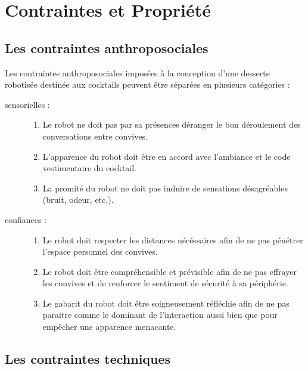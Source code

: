 \chapter{Contraintes et Propriété}

\section{Les contraintes anthroposociales}

Les contraintes anthroposociales imposées à la conception d'une desserte robotisée destinée aux cocktails peuvent être séparées en plusieurs catégories :
\begin{description}
\item[sensorielles :]
  \begin{enumerate}
  \item Le robot ne doit pas par sa présences déranger le bon déroulement des conversations entre convives.
  \item L'apparence du robot doit être en accord avec l'ambiance et le code vestimentaire du cocktail.
  \item La promité du robot ne doit pas induire de sensations désagréables (bruit, odeur, etc.).
  \end{enumerate}
\item[confiances :]
  \begin{enumerate}
  \item Le robot doit respecter les distances nécéssaires afin de ne pas pénétrer l'espace personnel des convives.
  \item Le robot doit être compréhensible et prévisible afin de ne pas effrayer les convives et de renforcer le sentiment de sécurité à sa périphérie.
  \item Le gabarit du robot doit être soigneusement réfléchie afin de ne pas paraitre comme le dominant de l'interaction aussi bien que pour empêcher une apparence menacante.
  \end{enumerate}
\end{description}




\section{Les contraintes techniques}

